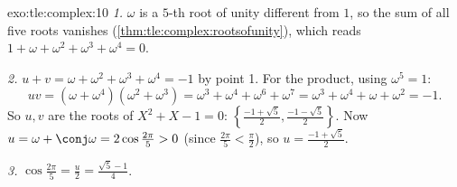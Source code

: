 \begin{solution}{exo:tle:complex:10}
\emph{1.} $\omega$ is a $5$-th root of unity different from $1$, so the sum
of all five roots vanishes (\cref{thm:tle:complex:rootsofunity}), which reads
$1 + \omega + \omega^2 + \omega^3 + \omega^4 = 0$.

\emph{2.} $u + v = \omega + \omega^2 + \omega^3 + \omega^4 = -1$ by point 1.
For the product, using $\omega^5 = 1$:
\[
uv = (\omega + \omega^4)(\omega^2 + \omega^3)
= \omega^3 + \omega^4 + \omega^6 + \omega^7
= \omega^3 + \omega^4 + \omega + \omega^2 = -1 .
\]
So $u, v$ are the roots of $X^2 + X - 1 = 0$:
$\left\{\frac{-1+\sqrt5}{2}, \frac{-1-\sqrt5}{2}\right\}$. Now
$u = \omega + \conj\omega = 2\cos\frac{2\pi}{5} > 0$ (since
$\frac{2\pi}{5} < \frac{\pi}{2}$), so $u = \frac{-1 + \sqrt5}{2}$.

\emph{3.} $\cos\frac{2\pi}{5} = \frac u2 = \frac{\sqrt5 - 1}{4}$.
\end{solution}
